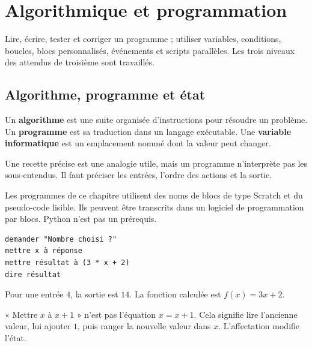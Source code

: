 \documentclass[../cours_3e.tex]{subfiles}
\begin{document}
\setcounter{chapter}{18}
\chapter{Algorithmique et programmation}
\label{ch:algo}
\begin{objectif}
Lire, écrire, tester et corriger un programme ; utiliser variables, conditions, boucles, blocs personnalisés, événements et scripts parallèles. Les trois niveaux des attendus de troisième sont travaillés.
\end{objectif}
\section{Algorithme, programme et état}
\begin{definition}
Un \textbf{algorithme} est une suite organisée d'instructions pour résoudre un problème. Un \textbf{programme} est sa traduction dans un langage exécutable. Une \textbf{variable informatique} est un emplacement nommé dont la valeur peut changer.
\end{definition}
Une recette précise est une analogie utile, mais un programme n'interprète pas les sous-entendus. Il faut préciser les entrées, l'ordre des actions et la sortie.

Les programmes de ce chapitre utilisent des noms de blocs de type Scratch et du pseudo-code lisible. Ils peuvent être transcrits dans un logiciel de programmation par blocs. Python n'est pas un prérequis.
\begin{exemple}
\begin{lstlisting}
demander "Nombre choisi ?"
mettre x à réponse
mettre résultat à (3 * x + 2)
dire résultat
\end{lstlisting}
Pour une entrée $4$, la sortie est $14$. La fonction calculée est $f(x)=3x+2$.
\end{exemple}
\begin{attention}
« Mettre $x$ à $x+1$ » n'est pas l'équation $x=x+1$. Cela signifie lire l'ancienne valeur, lui ajouter $1$, puis ranger la nouvelle valeur dans $x$. L'affectation modifie l'état.
\end{attention}
\end{document}
